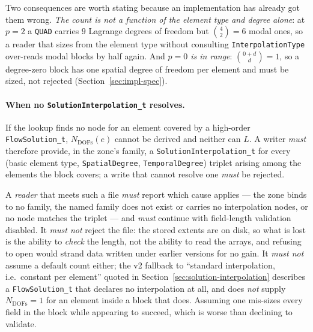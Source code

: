 \documentclass[11pt,letterpaper]{article}
\newif\ifvfourdraft
\newenvironment{v4block}{\ifvfourdraft\color{v4violet}\fi\ignorespaces}{\par}
\newcommand{\vfourmark}{\ifvfourdraft\textcolor{v4violet}{\textbf{[v4]}}\ \fi}
\begin{document}
\begin{v4block}
\smallskip
\noindent Two consequences are worth stating because an implementation has already
got them wrong.  \emph{The count is not a function of the element type and degree
alone}: at $p=2$ a \texttt{QUAD} carries $9$ Lagrange degrees of freedom but
$\binom{4}{2}=6$ modal ones, so a reader that sizes from the element type without
consulting \texttt{InterpolationType} over-reads modal blocks by half again.  And
\emph{$p=0$ is in range}: $\binom{0+d}{d} = 1$, so a degree-zero block has one
spatial degree of freedom per element and must be sized, not rejected
(Section~\ref{sec:impl-spec}).

\paragraph{\vfourmark When no \texttt{SolutionInterpolation\_t} resolves.}
If the lookup finds no node for an element covered by a high-order
\texttt{FlowSolution\_t}, $N_\mathrm{DOFs}(e)$ cannot be derived and neither can
$L$.  A writer \emph{must} therefore provide, in the zone's family, a
\texttt{SolutionInterpolation\_t} for every (basic element type,
\texttt{SpatialDegree}, \texttt{TemporalDegree}) triplet arising among the
elements the block covers; a write that cannot resolve one \emph{must} be
rejected.

A \emph{reader} that meets such a file \emph{must} report which cause applies ---
the zone binds to no family, the named family does not exist or carries no
interpolation nodes, or no node matches the triplet --- and \emph{must} continue
with field-length validation disabled.  It \emph{must not} reject the file: the
stored extents are on disk, so what is lost is the ability to \emph{check} the
length, not the ability to read the arrays, and refusing to open would strand
data written under earlier versions for no gain.  It \emph{must not} assume a
default count either; the v2 fallback to ``standard interpolation, i.e.\
constant per element'' quoted in Section~\ref{sec:solution-interpolation}
describes a \texttt{FlowSolution\_t} that declares no interpolation at all, and
does \emph{not} supply $N_\mathrm{DOFs} = 1$ for an element inside a block that
does.  Assuming one mis-sizes every field in the block while appearing to
succeed, which is worse than declining to validate.
\end{v4block}
\end{document}
